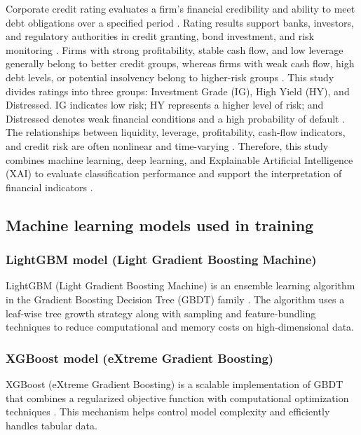 \documentclass[10pt,twoside]{article}
\begin{document}
Corporate credit rating evaluates a firm's financial credibility and ability to meet debt obligations over a specified period \cite{phu_nghi_nodate}. Rating results support banks, investors, and regulatory authorities in credit granting, bond investment, and risk monitoring \cite{hai_mo_2023}. Firms with strong profitability, stable cash flow, and low leverage generally belong to better credit groups, whereas firms with weak cash flow, high debt levels, or potential insolvency belong to higher-risk groups \cite{thuy_ung_2023}. This study divides ratings into three groups: Investment Grade (IG), High Yield (HY), and Distressed. IG indicates low risk; HY represents a higher level of risk; and Distressed denotes weak financial conditions and a high probability of default \cite{hung_xep_2023}. The relationships between liquidity, leverage, profitability, cash-flow indicators, and credit risk are often nonlinear and time-varying \cite{hai_mo_2023}. Therefore, this study combines machine learning, deep learning, and Explainable Artificial Intelligence (XAI) to evaluate classification performance and support the interpretation of financial indicators \cite{gramegna_shap_2021}.

\subsection{Machine learning models used in training}

\subsubsection{LightGBM model (Light Gradient Boosting Machine)}
LightGBM (Light Gradient Boosting Machine) is an ensemble learning algorithm in the Gradient Boosting Decision Tree (GBDT) family \cite{ke_lightgbm_2017}. The algorithm uses a leaf-wise tree growth strategy along with sampling and feature-bundling techniques to reduce computational and memory costs on high-dimensional data.

\subsubsection{XGBoost model (eXtreme Gradient Boosting)}
XGBoost (eXtreme Gradient Boosting) is a scalable implementation of GBDT that combines a regularized objective function with computational optimization techniques \cite{chen_xgboost_2016}. This mechanism helps control model complexity and efficiently handles tabular data.
\end{document}
